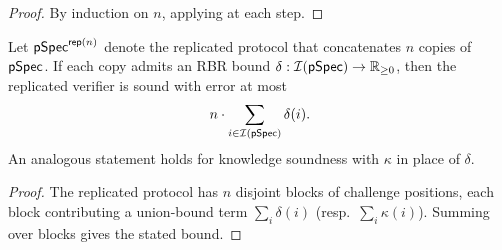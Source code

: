 \begin{proof}
By induction on $n$, applying  at each step.
\end{proof}

\begin{corollary}
\label{cor:rbr_soundness_comp_n}
Let $\mathsf{pSpec}^{\mathsf{rep}(n)}$ denote the replicated protocol that concatenates $n$ copies of
$\mathsf{pSpec}$. If each copy admits an RBR bound $\delta:\mathcal{I}(\mathsf{pSpec})\to\mathbb{R}_{\ge0}$, then the
replicated verifier is sound with error at most
\[
  n \cdot \sum_{i\in\mathcal{I}(\mathsf{pSpec})} \delta(i).
\]
An analogous statement holds for knowledge soundness with $\kappa$ in place of $\delta$.
\end{corollary}

\begin{proof}
The replicated protocol has $n$ disjoint blocks of challenge positions, each block contributing a
union-bound term $\sum_i \delta(i)$ (resp.\ $\sum_i \kappa(i)$). Summing over blocks gives the stated
bound.
\end{proof}

